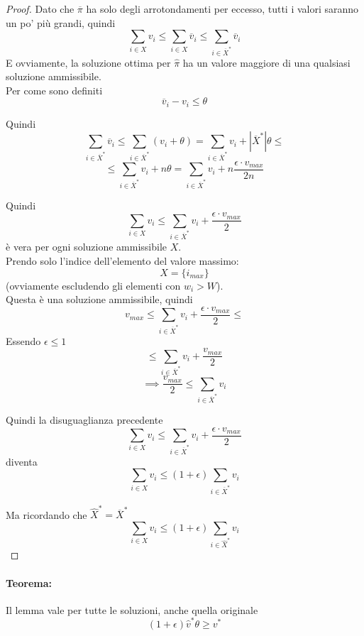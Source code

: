 \begin{proof}
	Dato che $\overline \pi$ ha solo degli arrotondamenti per eccesso, tutti i valori saranno un po' più grandi, quindi 
	$$ \sum_{i \in X} v_i \leq \sum_{i \in X} \overline v_i \leq \sum_{i \in \overline X^\ast} \overline v_i $$
	E ovviamente, la soluzione ottima per $\hat \pi$ ha un valore maggiore di una qualsiasi soluzione ammissibile.\\
	
	Per come sono definiti 
	$$\overline v_i - v_i \leq \theta $$
	
	Quindi 
	$$ \sum_{i \in \overline X^\ast} \overline v_i 
	\leq \sum_{i \in \overline X^\ast} (v_i + \theta) 
	= \sum_{i \in \overline X^\ast} v_i + |\overline X^\ast| \theta \leq $$
	$$\leq \sum_{i \in \overline X^\ast} v_i + n \theta 
	= \sum_{i \in \overline X^\ast} v_i + n \frac{\epsilon \cdot v_{max}}{2n}
	$$ 
	
	Quindi 
	$$ \sum_{i \in X} v_i \leq \sum_{i \in \overline X^\ast} v_i + \frac{\epsilon \cdot v_{max}}{2} $$
	è vera per ogni soluzione ammissibile $X$.\\
	
	Prendo solo l'indice dell'elemento del valore massimo:
	$$ X = \{i_{max}\}$$
	(ovviamente escludendo gli elementi con $w_i>W$).\\
	
	Questa è una soluzione ammissibile, quindi
	$$ v_{max} \leq \sum_{i \in \overline X^\ast} v_i + \frac{\epsilon \cdot v_{max}}{2} \leq  $$
	Essendo $\epsilon \leq 1$
	$$\leq  \sum_{i \in \overline X^\ast} v_i + \frac{v_{max}}{2}$$
	$$ \implies \frac{v_{max}}{2} \leq \sum_{i \in \overline X^\ast} v_i $$
	
	Quindi la disuguaglianza precedente
	$$ \sum_{i \in X} v_i \leq \sum_{i \in \overline X^\ast} v_i + \frac{\epsilon \cdot v_{max}}{2} $$
	diventa
	$$ \sum_{i \in X} v_i \leq (1 + \epsilon) \sum_{i \in \overline X^\ast} v_i$$
	
	Ma ricordando che $\hat X^\ast = \overline X^\ast$
	$$ \sum_{i \in X} v_i \leq (1 + \epsilon) \sum_{i \in \hat X^\ast} v_i $$
\end{proof}

\newpage

\paragraph{Teorema:} Il lemma vale per tutte le soluzioni, anche quella originale
$$(1 + \epsilon) \hat v^\ast \theta \geq v^\ast$$

